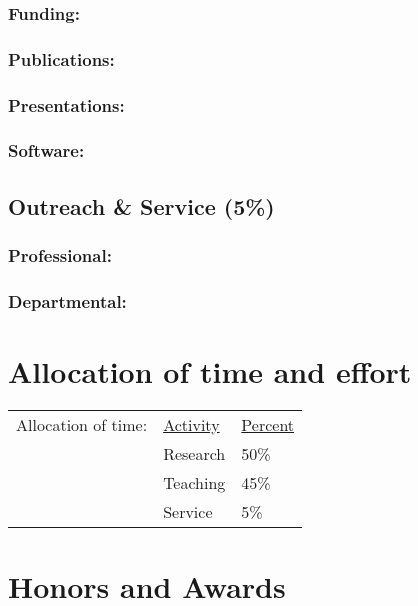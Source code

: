 \subsubsection{Funding:}


\subsubsection{Publications:}


\subsubsection{Presentations:}


\subsubsection{Software:}


\subsection{Outreach \& Service (5\%)}

\subsubsection{Professional:}


\subsubsection{Departmental:}


\section{Allocation of time and effort}
\begin{tabular}{ l l l }
    Allocation of time: & \underline{Activity} & \underline{Percent} \\
    & Research & 50\% \\
    & Teaching & 45\% \\
    & Service & 5\% \\
\end{tabular}


\section{Honors and Awards}



